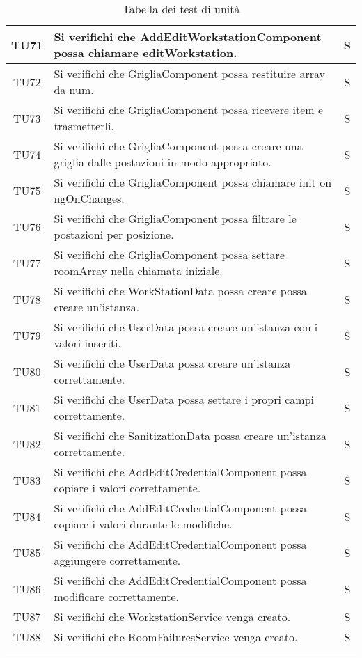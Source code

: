 \begin{center}
\begin{longtable}{|c|p{10cm}|c|}
			\hline
			TU71 & Si verifichi che AddEditWorkstationComponent possa chiamare editWorkstation. & S \\	
			\hline
			TU72 & Si verifichi che GrigliaComponent possa restituire array da num. & S \\	
			\hline
			TU73 & Si verifichi che GrigliaComponent possa ricevere item e trasmetterli. & S \\	
			\hline
			TU74 & Si verifichi che GrigliaComponent possa creare una griglia dalle postazioni in modo appropriato. & S \\	
			\hline
			TU75 & Si verifichi che GrigliaComponent possa chiamare init on ngOnChanges. & S \\	
			\hline
			TU76 & Si verifichi che GrigliaComponent possa filtrare le postazioni per posizione. & S \\	
			\hline
			TU77 & Si verifichi che GrigliaComponent possa settare roomArray nella chiamata iniziale. & S \\	
			\hline
			TU78 & Si verifichi che WorkStationData possa creare possa creare un'istanza. & S \\	
			\hline
			TU79 & Si verifichi che UserData possa creare un'istanza con i valori inseriti. & S \\	
			\hline
			TU80 & Si verifichi che UserData possa creare un'istanza correttamente. & S \\	
			\hline
			TU81 & Si verifichi che UserData possa settare i propri campi correttamente. & S \\	
			\hline
			TU82 & Si verifichi che SanitizationData possa creare un'istanza correttamente. & S \\	
			\hline
			TU83 & Si verifichi che AddEditCredentialComponent possa copiare i valori correttamente. & S \\	
			\hline
			TU84 & Si verifichi che AddEditCredentialComponent possa copiare i valori durante le modifiche. & S \\	
			\hline
			TU85 & Si verifichi che AddEditCredentialComponent possa aggiungere correttamente. & S \\	
			\hline
			TU86 & Si verifichi che AddEditCredentialComponent possa modificare correttamente. & S \\	
			\hline
			TU87 & Si verifichi che WorkstationService venga creato. & S \\	
			\hline
			TU88 & Si verifichi che RoomFailuresService venga creato. & S \\	
			\hline
			\hiderowcolors
			\caption{Tabella dei test di unità}		
		\end{longtable}	
	\end{center}

